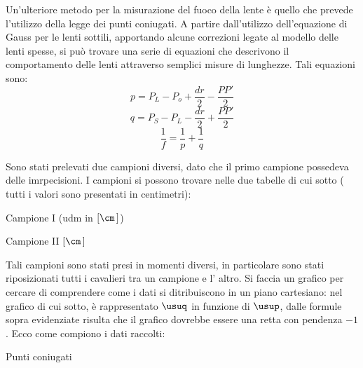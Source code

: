 Un'ulteriore metodo per la misurazione del fuoco della lente è quello che prevede l'utilizzo della legge dei punti coniugati.
 A partire dall'utilizzo dell'equazione di Gauss per le lenti sottili, apportando alcune correzioni legate al modello delle lenti
 spesse, si può trovare una serie di equazioni che descrivono il comportamento delle lenti attraverso semplici misure di
 lunghezze. Tali equazioni sono:
\[p=P_L - P_o + \frac {dr} {2} - \frac {PP'}{2}\]
\[q=P_S - P_L -\frac {dr} {2} + \frac {PP'} {2}\]
\[\frac{1}{f} = \frac {1}{p} + \frac {1}{q}\]

 Sono stati prelevati due campioni diversi, dato che il primo campione possedeva delle imrpecisioni. I campioni si possono trovare
 nelle due tabelle di cui sotto ( tutti i valori sono presentati in centimetri):
\begin{tabella}
	\centering
	
	\caption{Campione I (udm in $[\cm\,]$)}
	\label{tab:02tab1}
\end{tabella}

\begin{tabella}
	\centering
	
	\caption{Campione II $[\cm\,]$}
	\label{tab:02tab2}
\end{tabella}

Tali campioni sono stati presi in momenti diversi, in particolare sono stati riposizionati tutti i cavalieri tra un campione e l'
 altro. Si faccia un grafico per cercare di comprendere come i dati si ditribuiscono in un piano cartesiano: nel grafico di cui
 sotto, è rappresentato $\usuq$ in funzione di $\usup$, dalle formule sopra evidenziate risulta che il grafico dovrebbe essere una retta con
 pendenza $-1$. Ecco come compiono i dati raccolti:
\begin{grafico} \centering  \caption{Punti coniugati} \label{gr:02graph1.tex} \end{grafico}


